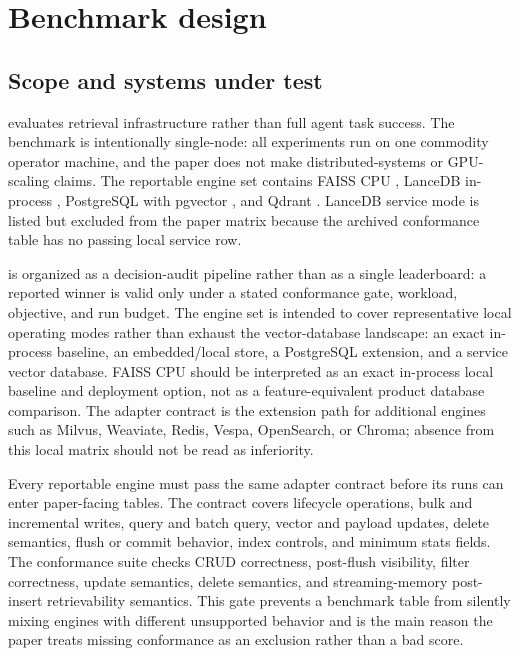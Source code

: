 \section{Benchmark design}

\subsection{Scope and systems under test}

\sys evaluates retrieval infrastructure rather than full agent task success. The benchmark is intentionally single-node: all experiments run on one commodity operator machine, and the paper does not make distributed-systems or GPU-scaling claims. The reportable engine set contains FAISS CPU \citep{johnson2019faiss}, LanceDB in-process \citep{lancedb}, PostgreSQL with pgvector \citep{pgvector}, and Qdrant \citep{qdrant}. LanceDB service mode is listed but excluded from the paper matrix because the archived conformance table has no passing local service row.

\sys is organized as a decision-audit pipeline rather than as a single leaderboard: a reported winner is valid only under a stated conformance gate, workload, objective, and run budget. The engine set is intended to cover representative local operating modes rather than exhaust the vector-database landscape: an exact in-process baseline, an embedded/local store, a PostgreSQL extension, and a service vector database. FAISS CPU should be interpreted as an exact in-process local baseline and deployment option, not as a feature-equivalent product database comparison. The adapter contract is the extension path for additional engines such as Milvus, Weaviate, Redis, Vespa, OpenSearch, or Chroma; absence from this local matrix should not be read as inferiority.

Every reportable engine must pass the same adapter contract before its runs can enter paper-facing tables. The contract covers lifecycle operations, bulk and incremental writes, query and batch query, vector and payload updates, delete semantics, flush or commit behavior, index controls, and minimum stats fields. The conformance suite checks CRUD correctness, post-flush visibility, filter correctness, update semantics, delete semantics, and streaming-memory post-insert retrievability semantics. This gate prevents a benchmark table from silently mixing engines with different unsupported behavior and is the main reason the paper treats missing conformance as an exclusion rather than a bad score.


